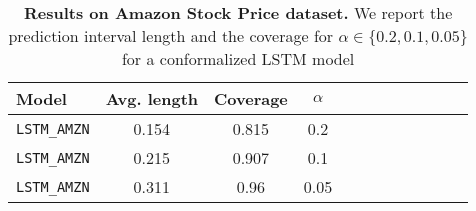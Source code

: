 \begin{table}[t] 
\centering 
\small 
\begin{tabular}{lccccccccccc} 
\toprule 
Model & Avg. length & Coverage & $ \alpha$ \\ 
\midrule 
\verb|LSTM_AMZN| & 0.154 & 0.815 & 0.2 \\ 
\verb|LSTM_AMZN| & 0.215 & 0.907 & 0.1 \\ 
\verb|LSTM_AMZN| & 0.311 & 0.96 & 0.05 \\ 
\bottomrule 
\end{tabular} 
\caption{\textbf{Results on Amazon Stock Price dataset.} We report the prediction interval length and the coverage for $\alpha \in \{ 0.2, 0.1, 0.05 \}$ for a conformalized LSTM model} 
\label{table:amazon_stock_price.1} 
\end{table} 
